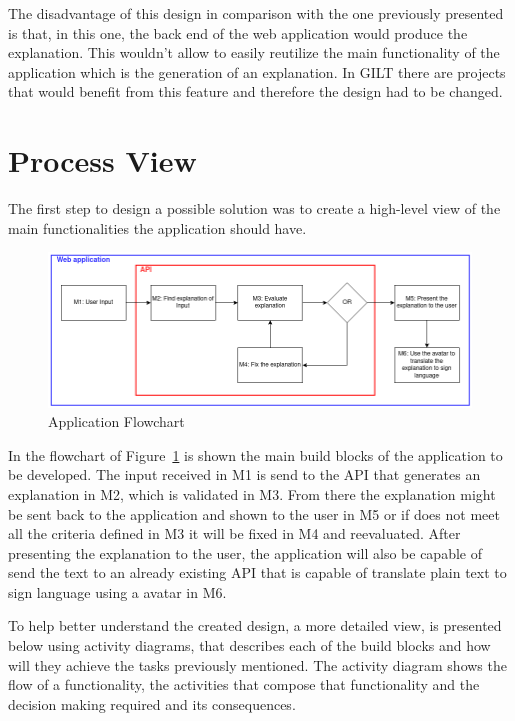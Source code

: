 The disadvantage of this design in comparison with the one previously presented is that, in this one, the back end of the web application would produce the explanation.
This wouldn't allow to easily reutilize the main functionality of the application which is the generation of an explanation.
In GILT there are projects that would benefit from this feature and therefore the design had to be changed.

\section{Process View}

The first step to design a possible solution was to create a high-level view of the main functionalities the application should have.

\begin{figure}[H]
\centering
\includegraphics[width=\textwidth,keepaspectratio]{ch4/assets/diagram1_2.png}
\caption[Application Flowchart]{Application Flowchart}
\label{fig:Diagram1}
\end{figure}

In the flowchart of Figure~\ref{fig:Diagram1} is shown the main build blocks of the application to be developed.
The input received in M1 is send to the \gls{API} that generates an explanation in M2, which is validated in M3.
From there the explanation might be sent back to the application and shown to the user in M5  or if does not meet all the criteria defined in M3 it will be fixed in M4 and reevaluated.
After presenting the explanation to the user, the application will also be capable of send the text to an already existing \gls{API} that is capable of translate plain text to sign language using a avatar in M6.

To help better understand the created design, a more detailed view, is presented below using activity diagrams, that describes each of the build blocks and how will they achieve the tasks previously mentioned.
The activity diagram shows the flow of a functionality, the activities that compose that functionality and the decision making required and its consequences.

